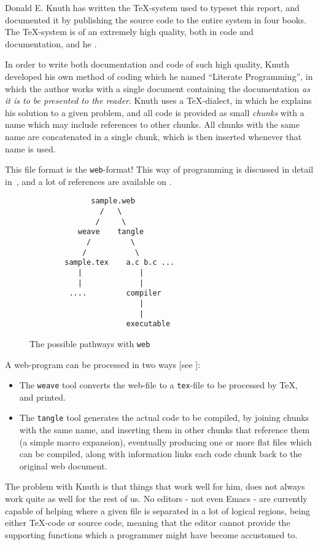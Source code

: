 Donald E. Knuth has written the {\TeX}-system used to typeset this
report, and documented it by publishing the source code to the entire
system in four books.  The {\TeX}-system is of an extremely high
quality, both in code and documentation, and he
.

In order to write both documentation and code of such high quality,
Knuth developed his own method of coding which he named ``Literate
Programming'', in which the author works with a single document
containing the documentation \textit{as it is to be presented to the
reader}.  Knuth uses a {\TeX}-dialect, in which he explains his
solution to a given problem, and all code is provided as small
\textit{chunks} with a name which may include references to other
chunks.  All chunks with the same name are concatenated in a single
chunk, which is then inserted whenever that name is used.

This file format is the \texttt{web}-format!  This way of
programming is discussed in detail
in~\cite{sewell:weaving-a-program}, and a lot of references
are available on
.

\begin{figure}[htbp]
  \begin{center}
\begin{verbatim}
              sample.web
                /   \
               /     \
           weave    tangle
             /         \
            /           \
        sample.tex    a.c b.c ...
           |             |
           |             |
         ....         compiler
                         |
                         |
                      executable
\end{verbatim}
    \caption{The possible pathways with \texttt{web}}
    \label{fig:web-pathways}
  \end{center}
\end{figure}


A web-program can be processed in two ways [see ]:

\begin{itemize}
\item
The \texttt{weave} tool converts the web-file to a \texttt{tex}-file
to be processed by {\TeX}, and printed.

\item The \texttt{tangle} tool generates the actual code to be
compiled, by joining chunks with the same name, and inserting them in
other chunks that reference them (a simple macro expansion),
eventually producing one or more flat files which can be compiled,
along with information links each code chunk back to the original web document.

\end{itemize}
The problem with Knuth is that things that work well for him, does not
always work quite as well for the rest of us.  No editors - not even
Emacs - are currently capable of helping where a given file is
separated in a lot of logical regions, being either {\TeX}-code or
source code, meaning that the editor cannot provide the supporting
functions which a programmer might have become accustomed to.

